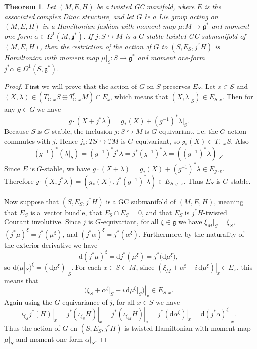\documentclass[11pt]{article}
\newtheorem{Theorem}{Theorem}[section]
\numberwithin{equation}{section}
\newcommand{\func}[3]{#1 \colon #2 \to #3}
\newcommand{\hookfunc}[3]{#1 \colon #2 \hookrightarrow #3}
\newcommand{\eval}[2]{\left. #1 \right|_{#2}}
\newcommand{\tang}{T}
\begin{document}
\begin{Theorem} \label{thm6}
Let $(M,E,H)$ be a twisted GC manifold, where $E$ is the associated complex Dirac structure, and let $G$ be a Lie group acting on $(M,E,H)$ in a Hamiltonian fashion with moment map $\func{\mu}{M}{\mathfrak{g}^*}$ and moment one-form $\alpha \in \Omega^1(M,\mathfrak{g}^*)$.
If $\hookfunc{j}{S}{M}$ is a $G$-stable twisted GC submanifold of $(M,E,H)$, then the restriction of the action of $G$ to $(S,E_S,j^* H)$ is Hamiltonian with moment map $\func{\mu|_S}{S}{\mathfrak{g}^*}$ and moment one-form $j^* \alpha \in \Omega^1(S,\mathfrak{g}^*)$.
\end{Theorem}


\begin{proof}
First we will prove that the action of $G$ on $S$ preserves $E_S$.  Let $x \in S$ and $(X, \lambda) \in (\tang_{\mathbb{C}, x} S \oplus \tang_{\mathbb{C}, x}^{\ast} M) \cap E_x$, which means that $(X, \lambda|_S) \in E_{S,x}$.  Then for any $g \in G$ we have
\[
  g \cdot (X + j^* \lambda) = g_* (X) + (g^{-1})^* \lambda|_S.
\]
Because $S$ is $G$-stable, the inclusion $\hookfunc{j}{S}{M}$ is $G$-equivariant, i.e. the $G$-action commutes with $j$.  Hence $\hookfunc{j_*}{\tang S}{\tang M}$ is $G$-equivariant, so $g_* (X) \in \tang_{g \cdot x} S$.  Also
\[
  (g^{-1})^* \left( \lambda|_S \right)
  =
  (g^{-1})^* j^* \lambda
  =
  j^* (g^{-1})^* \lambda
  =
  \left( (g^{-1})^* \lambda \right)|_S.
\]
Since $E$ is $G$-stable, we have $g \cdot (X + \lambda) = g_* (X) + (g^{-1})^* \lambda \in E_{g \cdot x}$.  Therefore $g \cdot (X, j^* \lambda) = \left( g_* (X), j^* (g^{-1})^* \lambda \right) \in E_{S, g \cdot x}$.  Thus $E_S$ is $G$-stable.


Now suppose that $(S,E_S,j^* H)$ is a GC submanifold of $(M,E,H)$, meaning that $E_S$ is a~vector bundle, that $E_S \cap \overline{E_S} = 0$, and that $E_S$ is $j^* H$-twisted Courant involutive.  Since $j$ is $G$-equivariant, for all $\xi \in \mathfrak{g}$ we have $\xi_M|_S = \xi_S$, $(j^* \mu)^{\xi} = j^* (\mu^{\xi})$, and $(j^* \alpha)^{\xi} = j^* (\alpha^{\xi})$.  Furthermore, by the naturality of the exterior derivative we have
\[
  \mathrm{d} (j^* \mu)^{\xi}
  =
  \mathrm{d} j^* (\mu^{\xi})
  =
  j^* \big(\mathrm{d} \mu^{\xi}\big),
\]
so $\mathrm{d} (\mu|_{S})^{\xi} = (\mathrm{d} \mu^{\xi})|_S$.  For each $x \in S \subset M$, since $\eval{\left( \xi_M + \alpha^{\xi} - i \, \mathrm{d} \mu^{\xi} \right)}{x} \in E_x$, this means that
\[
  \eval{\big( \xi_S + \alpha^{\xi}|_S - i \, \mathrm{d} \mu^{\xi}\big|_S \big)}{x} \in E_{S,x}.
\]
Again using the $G$-equivariance of $j$, for all $x \in S$ we have
\[
  \eval{\iota_{\xi_S} j^* (H)}{x}
  =
  \eval{j^* (\iota_{\xi_S} H)}{x}
  =
  \eval{j^* (\iota_{\xi_M} H)}{x}
  =
  \eval{j^* (\mathrm{d} \alpha^{\xi})}{x}
  =
  \eval{\mathrm{d} (j^* \alpha)^{\xi}}{x}.
\]
Thus the action of $G$ on $(S,E_S,j^* H)$ is twisted Hamiltonian with moment map $\mu|_S$ and moment one-form $\alpha|_S$.
\end{proof}
\end{document}

